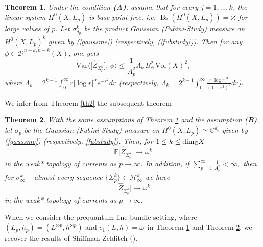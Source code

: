 \documentclass[11pt,leqno,oneside]{amsart}
\newtheorem{thm}{Theorem}[section]
\numberwithin{equation}{section}
\begin{document}
     \begin{thm}\label{Vard} Under the condition \textbf{(A)}, assume that for every $j=1,\ldots,k$,
the linear system $H^{0}(X, L_p)$ is base-point free, i.e. $\operatorname{Bs}(H^{0}(X, L_p))=\varnothing$ for large values of $p$. Let $\sigma^{k}_{d_{p}}$ be the product Gaussian (Fubini-Study) measure on $H^{0}(X, L_{p})^{k}$ given by (\ref{gaussme}) (respectively,  (\ref{fubstudy})). Then for any  $\phi\in \mathcal{D}^{n-k, n-k}(X)$, one gets \begin{equation}\label{mainvar-gf}  \mathrm{Var}\big\langle \big[\widehat{Z}_{\Sigma_{p}^{k}}\big],\, \phi \big\rangle \leq \frac{1}{A^{2}_{p}}\Lambda_{k}\,B^{2}_{\phi} \,\mathrm{Vol}(X)^{2}, \end{equation}where  $\Lambda_{k}=2^{k-1}\int_{0}^{\infty}{r|\log{r}|^{\alpha} e^{-r^{2}} dr}$ (respectively, $\Lambda_{k}=2^{k-1}\int_{0}^{\infty}{\frac{r|\log{r}|^{\alpha}}{(1+r^{2})^{2}}dr}$).  \end{thm}

We infer from Theorem \ref{th2} the subsequent theorem

 \begin{thm} \label{GauFub}
With the same assumptions of Theorem \ref{Vard} and the assumption \textbf{(B)}, let $\sigma_{p}$ be the Gaussian (Fubini-Study) measure on   $H^{0}(X, L_{p})\simeq \mathbb{C}^{d_{p}}$ given by (\ref{gaussme}) (respectively, \ref{fubstudy}). Then, for $1\leq k \leq \textup{dim}_{\mathbb{C}} X$
	\begin{equation}
		\mathbb{E}\big[\widehat{Z}_{\Sigma_{p}^{k}}\big]\longrightarrow \omega^k
	\end{equation}
	in the weak* topology of currents as $p\rightarrow \infty.$ In addition, if $\sum_{p=1}^{\infty}\frac{1}{A^{2}_{p}}< \infty,$  then for $\sigma^{k}_{\infty}-$almost every sequence $\{\Sigma_{p}^{k}\}\in \mathcal{H}^{k}_{\infty}$ we have
	\begin{equation}
		\big[\widehat{Z}_{\Sigma_{p}^{k}}\big]\longrightarrow \omega^k
	\end{equation}
	in the weak* topology of currents as $p \rightarrow \infty.$
 \end{thm}

When we consider the prequantum line bundle setting, where $(L_{p}, h_{p})=(L^{\otimes p}, h^{\otimes p})$ and  $c_{1}(L, h)= \omega \,$ in Theorem \ref{Vard} and Theorem \ref{GauFub}, we recover the results of Shiffman-Zelditch (\cite{SZ99}).
\end{document}
